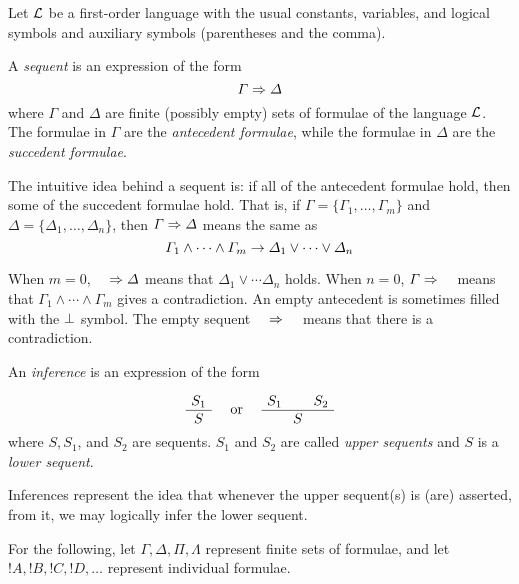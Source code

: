 \documentclass[open-logic-section]{subfiles}
\begin{document}


Let $\mathcal L$ be a first-order language with the usual constants, variables, and logical symbols and auxiliary symbols (parentheses and the comma). 

\begin{defn}[sequent]
A \emph{sequent} is an expression of the form
\[ \Gamma \Rightarrow \Delta \]
where $\Gamma$ and $\Delta$ are finite (possibly empty) sets of formulae of the language $\mathcal L$. The formulae in $\Gamma$ are the \emph{antecedent formulae}, while the formulae in $\Delta$ are the \emph{succedent formulae}. 

The intuitive idea behind a sequent is: if all of the antecedent formulae hold, then some of the succedent formulae hold. That is, if $\Gamma = \{ \Gamma_1,\ldots,\Gamma_m\}$ and $\Delta = \{ \Delta_1,\ldots, \Delta_n\}$, then $\Gamma \Rightarrow \Delta$ means the same as 
\[ \Gamma_1 \land \cdots \land \Gamma_m \to \Delta_1 \lor \cdots \lor \Delta_n \]

When $m=0$, $\hspace{1em} \Rightarrow \Delta$ means that $\Delta_1 \lor \cdots \Delta_n$ holds. When $n=0$, $\Gamma \Rightarrow \hspace{1em}$ means that $\Gamma_1 \land \cdots \land \Gamma_m$ gives a contradiction. An empty antecedent is sometimes filled with the $\bot$ symbol. The empty sequent $\hspace{1em} \Rightarrow \hspace{1em}$ means that there is a contradiction.
\end{defn}

\begin{defn}[Inference]
An \emph{inference} is an expression of the form

\[
\AxiomC{$S_1$}
\UnaryInfC{$S$}
\DisplayProof
\quad
\textrm{  or  }
\quad
\AxiomC{$S_1$}
\AxiomC{$S_2$}
\BinaryInfC{$S$}
\DisplayProof
\]
where $S, S_1$, and $S_2$ are sequents. $S_1$ and $S_2$ are called \emph{upper sequents} and $S$ is a \emph{lower sequent}.

Inferences represent the idea that whenever the upper sequent(s) is (are) asserted, from it, we may logically infer the lower sequent.
\end{defn}

For the following, let $\Gamma, \Delta, \Pi, \Lambda$ represent finite sets of formulae, and let $!A, !B, !C, !D, \ldots$ represent individual formulae.
\end{document}
